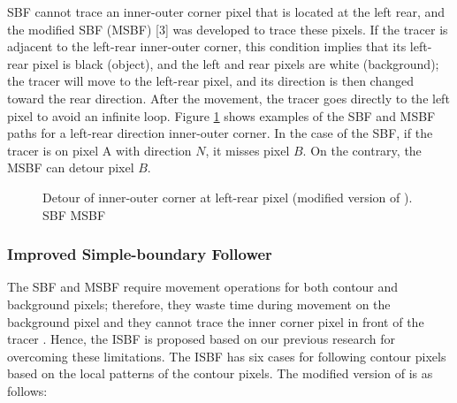 SBF cannot trace an inner-outer corner pixel that is located at the left rear, and the modified SBF (MSBF) [3] was developed to trace these pixels. If the tracer is adjacent to the left-rear inner-outer corner, this condition implies that its left-rear pixel is black (object), and the left and rear pixels are white (background); the tracer will move to the left-rear pixel, and its direction is then changed toward the rear direction. After the movement, the tracer goes directly to the left pixel to avoid an infinite loop. Figure \ref{fig:image3} shows examples of the SBF and MSBF paths for a left-rear direction inner-outer corner. In the case of the SBF, if the tracer is on pixel A with direction $N$, it misses pixel $B$. On the contrary, the MSBF can detour pixel $B$.

\begin{figure}[htbp]
	\centering
	 
	\caption{Detour of inner-outer corner at left-rear pixel (modified version of \cite{Gose1996Pattern}). \protect{} SBF \protect{} MSBF}
	\label{fig:image3}
\end{figure}

\subsubsection{Improved Simple-boundary Follower}

The SBF and MSBF require movement operations for both contour and background pixels; therefore, they waste time during movement on the background pixel and they cannot trace the inner corner pixel in front of the tracer \cite{Cheong2006Improved,Toussaint????Grids}. Hence, the ISBF \cite{Cheong2006Improved} is proposed based on our previous research for overcoming these limitations. The ISBF has six cases for following contour pixels based on the local patterns of the contour pixels. The modified version of \cite{Cheong2006Advanced} is as follows: 

